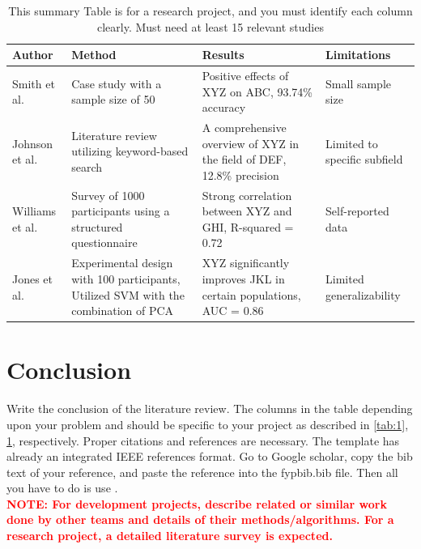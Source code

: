 \documentclass{FastFyp}
\begin{document}
\begin{table}[!h]
\caption{This summary Table is for a research project, and you must identify each column clearly. Must need at least 15 relevant studies}
\centering
\begin{tabular}{|p{3cm}|p{4cm}|p{4cm}|p{3cm}|}
\hline
\textbf{Author} & \textbf{Method} & \textbf{Results} & \textbf{Limitations} \\
\hline
Smith et al. \cite{ref:Bishop:2006}& Case study with a sample size of 50 & Positive effects of XYZ on ABC, 93.74\% accuracy & Small sample size \\
\hline
Johnson et al. \cite{ref:Duda:2000} & Literature review utilizing keyword-based search & A comprehensive overview of XYZ in the field of DEF, 12.8\% precision & Limited to specific subfield \\
\hline
Williams et al. \cite{ref:IJCNNChallenge:2007} & Survey of 1000 participants using a structured questionnaire & Strong correlation between XYZ and GHI, R-squared = 0.72 & Self-reported data \\
\hline
Jones et al. \cite{ref:SVMGuide} & Experimental design with 100 participants, Utilized SVM with the combination of PCA & XYZ significantly improves JKL in certain populations, AUC = 0.86 & Limited generalizability \\
\hline
\end{tabular}
\label{tab:2}
\end{table}

\section{Conclusion}
Write the conclusion of the literature review. 
The columns in the table depending upon your problem and should be specific to your project as described in \ref{tab:1}, \ref{tab:2}, respectively. Proper citations and references are necessary. The template has already an integrated IEEE references format. Go to Google scholar, copy the bib text of your reference, and paste the reference into the fypbib.bib file. Then all you have to do is use \cite{ref:Bishop:2006}.\\ \textcolor{red}{\textbf{NOTE: For development projects, describe related or similar work done by other teams and details of their methods/algorithms. For a research project, a detailed literature survey is expected.}}
 
\end{document}
